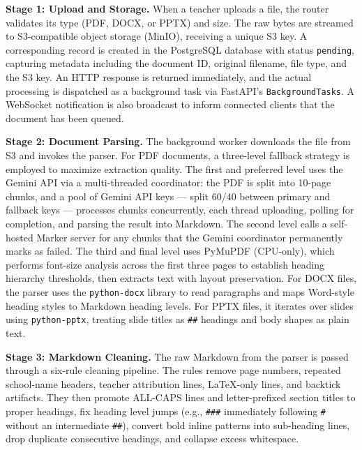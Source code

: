 \documentclass[12pt,a4paper]{article}
\begin{document}
\textbf{Stage 1: Upload and Storage.} When a teacher uploads a file, the router validates its type (PDF, DOCX, or PPTX) and size. The raw bytes are streamed to S3-compatible object storage (MinIO), receiving a unique S3 key. A corresponding record is created in the PostgreSQL database with status \texttt{pending}, capturing metadata including the document ID, original filename, file type, and the S3 key. An HTTP response is returned immediately, and the actual processing is dispatched as a background task via FastAPI's \texttt{BackgroundTasks}. A WebSocket notification is also broadcast to inform connected clients that the document has been queued.

\textbf{Stage 2: Document Parsing.} The background worker downloads the file from S3 and invokes the parser. For PDF documents, a three-level fallback strategy is employed to maximize extraction quality. The first and preferred level uses the Gemini API via a multi-threaded coordinator: the PDF is split into 10-page chunks, and a pool of Gemini API keys — split 60/40 between primary and fallback keys — processes chunks concurrently, each thread uploading, polling for completion, and parsing the result into Markdown. The second level calls a self-hosted Marker server for any chunks that the Gemini coordinator permanently marks as failed. The third and final level uses PyMuPDF (CPU-only), which performs font-size analysis across the first three pages to establish heading hierarchy thresholds, then extracts text with layout preservation. For DOCX files, the parser uses the \texttt{python-docx} library to read paragraphs and maps Word-style heading styles to Markdown heading levels. For PPTX files, it iterates over slides using \texttt{python-pptx}, treating slide titles as \texttt{##} headings and body shapes as plain text.

\textbf{Stage 3: Markdown Cleaning.} The raw Markdown from the parser is passed through a six-rule cleaning pipeline. The rules remove page numbers, repeated school-name headers, teacher attribution lines, LaTeX-only lines, and backtick artifacts. They then promote ALL-CAPS lines and letter-prefixed section titles to proper headings, fix heading level jumps (e.g., \texttt{###} immediately following \texttt{#} without an intermediate \texttt{##}), convert bold inline patterns into sub-heading lines, drop duplicate consecutive headings, and collapse excess whitespace.
\end{document}

